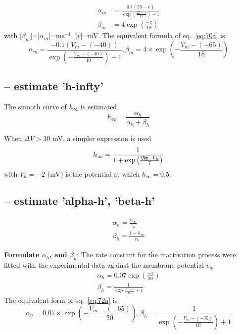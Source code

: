 \begin{equation}
  \label{eq:70a}
  \begin{split}
      \alpha_m &= \frac{0.1(25-v)}{\exp(\frac{25-v}{10})-1} \\
      \beta_m &= 4 \exp(\frac{-v}{18})
  \end{split}
\end{equation}
with [$\beta_m$]=[$\alpha_m$]=ms$^{-1}$, [$v$]=mV.
The equivalent formula of eq.~\eqref{eq:70a} is
\begin{equation}
  \label{eq:353}
      \alpha_m = \frac{-0.1(V_m - (-40))}{\exp(-\frac{V_m - (-40)}{10})-1} ,
      \beta_m = 4 \times \exp(-\frac{V_m - (-65)}{18})
\end{equation}


\subsection{-- estimate 'h-infty'}

The smooth curve of $h_\infty$ is estimated
\begin{equation}
h_\infty = \frac{\alpha_h}{\alpha_h + \beta_h}
\end{equation}

When $\Delta V > 30$ mV, a simpler expression is used
\begin{equation}
h_\infty = \frac{1}{1 + \exp\left( \frac{\Vm - V_h}{7} \right)}
\end{equation}
with $V_h=-2$ (mV) is the potential at which $h_\infty = 0.5$.

\subsection{-- estimate 'alpha-h', 'beta-h'}

\begin{equation}
\begin{split}
\alpha_h = \frac{h_\infty}{\tau_h} \\
\beta_h = \frac{1- h_\infty}{\tau_h}
\end{split}
\end{equation}


{\bf Formulate $\alpha_h$, and $\beta_h$}: The rate constant for the
inactivation process were fitted with the experimental data against
the membrane potential $v_m$
\begin{equation}
  \label{eq:72a}
  \begin{split}
      \alpha_h = 0.07 \exp (\frac{-v}{20})  \\
      \beta_h = \frac{1}{\exp\frac{30-v}{10} + 1}
  \end{split}
\end{equation}
The equivalent form of eq.~\eqref{eq:72a} is
\begin{equation}
  \label{eq:354}
      \alpha_h = 0.07\times \exp (-\frac{V_m - (-65)}{20})  ,
      \beta_h = \frac{1}{\exp(-\frac{V_m - (-35)}{10}) + 1}
\end{equation}

